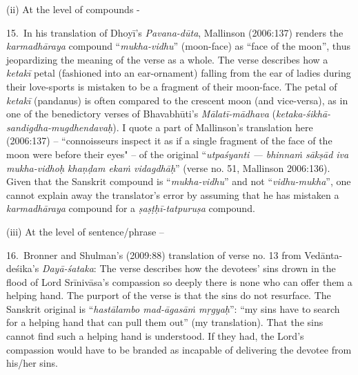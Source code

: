 (ii) At the level of compounds -

15.~In his translation of Dhoyī’s \textsl{Pavana-dūta}, Mallinson (2006:137) renders the \textsl{karmadhāraya} compound “\textsl{mukha-vidhu}” (moon-face) as “face of the moon”, thus jeopardizing the meaning of the verse as a whole. The verse describes how a \textsl{ketakī} petal (fashioned into an ear-ornament) falling from the ear of ladies during their love-sports is mistaken to be a fragment of their moon-face. The petal of \textsl{ketakī} (pandanus) is often compared to the crescent moon (and vice-versa), as in one of the benedictory verses of Bhavabhūti’s \textsl{Mālatī-mādhava} (\textsl{ketaka-śikhā-sandigdha-mugdhendavaḥ}). I quote a part of Mallinson's translation here (2006:137) -- ``connoisseurs inspect it as if a single fragment of the face of the moon were before their eyes" -- of the original “\textsl{utpaśyanti --- bhinnaṁ sākṣād iva mukha-vidhoḥ khaṇḍam ekaṁ vidagdhāḥ}” (verse no. 51, Mallinson 2006:136). Given that the Sanskrit compound is “\textsl{mukha-vidhu}” and not “\textsl{vidhu-mukha}”, one cannot explain away the translator’s error by assuming that he has mistaken a \textsl{karmadhāraya} compound for a \textsl{ṣaṣṭḥī-tatpuruṣa} compound. 

(iii) At the level of sentence/phrase -- 

16.~Bronner and Shulman's (2009:88) translation of verse no. 13 from Vedānta-deśika’s \textsl{Dayā-śataka}: The verse describes how the devotees’ sins drown in the flood of Lord Srīnivāsa’s compassion so deeply there is none who can offer them a helping hand. The purport of the verse is that the sins do not resurface. The Sanskrit original is “\textsl{hastālambo mad-āgasāṁ mṛgyaḥ}”: “my sins have to search for a helping hand that can pull them out” (my translation). That the sins cannot find such a helping hand is understood. If they had, the Lord’s compassion would have to be branded as incapable of delivering the devotee from his/her sins.

